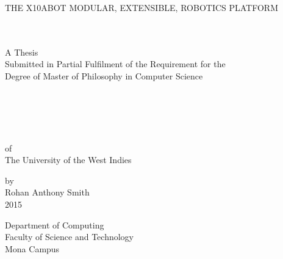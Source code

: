 \documentclass[a4paper, 12pt, oneside]{Thesis}
\begin{document}
\newcommand{\xten}{\texttt{X10ABOT} }
\newcommand{\reg}{\textsuperscript{\textregistered}}
\newcommand{\lego}{LEGO\reg }
\newcommand{\iic}{I$^2$C }
\newcommand{\includecode}[1]{\inputminted[linenos=true,breaklines=true,baselinestretch=1,frame=lines,framesep=2mm,label=\url{#1}]{c}{#1}}


\pagestyle{fancy}
\frontmatter

\begin{titlepage}
\singlespacing
\begin{center}

{\uppercase{The X10ABOT Modular, Extensible, Robotics Platform}}
\mbox{ }\\ 
\mbox{ }\\ 
\mbox{ }\\ 
\begin{center}
A Thesis\\ 
Submitted in Partial Fulfilment of the Requirement for the \\
Degree of Master of Philosophy in Computer Science\\
\mbox{ }\\ 
\mbox{ }\\ 
\mbox{ }\\ 
\mbox{ }\\ 
\mbox{ }\\ 
of\\
The University of the West Indies\\
\end{center}
\vfill
by\\
Rohan Anthony Smith\\
2015\\
\end{center}
Department of Computing\\
Faculty of Science and Technology\\
Mona Campus

\end{titlepage}
\end{document}
